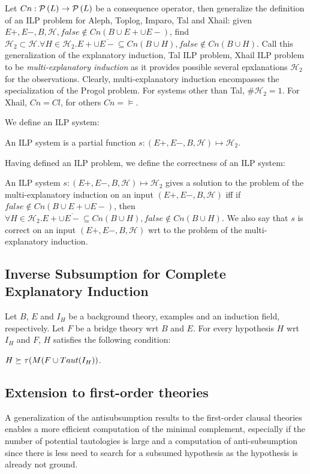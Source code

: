 Let $Cn:\mathcal{P} \left({ L }\right) \to \mathcal{P} \left({ L }\right)$ be a consequence operator, then generalize the definition of an ILP problem for Aleph, Toplog, Imparo, Tal and Xhail:
given $E+, E-, B, \mathcal{H}, false \not\in Cn(B \cup E+ \cup E-)$,
find $\mathcal{H}_2 \subset \mathcal{H}. \forall H \in \mathcal{H}_2. E+ \cup \overline{E-} \subseteq Cn(B \cup H), false \not\in Cn(B \cup H)$. Call this generalization of the explanatory induction, Tal ILP problem, Xhail ILP problem to be \emph{multi-explanatory induction} as it provides possible several epxlanations $\mathcal{H}_2$ for the observations. Clearly, multi-explanatory induction encompasses the specialization of the Progol problem. For systems other than Tal, $\#\mathcal{H}_2=1$. For Xhail, $Cn=Cl$, for others $Cn=\models$.

We define an ILP system:
\begin{defn}
An ILP system is a partial function $s:(E+,E-,B, \mathcal{H}) \mapsto \mathcal{H}_2$.
\end{defn}
Having defined an ILP problem, we define the correctness of an ILP system:
\begin{defn}
An ILP system $s:(E+,E-,B, \mathcal{H}) \mapsto \mathcal{H}_2$ gives a solution to the problem of the multi-explanatory induction on an input $(E+,E-,B, \mathcal{H})$ iff if $false \not\in Cn(B \cup E+ \cup E-)$,
then $\forall H \in \mathcal{H}_2. E+ \cup \overline{E-} \subseteq Cn(B \cup H), false \not\in Cn(B \cup H)$. We also say that $s$ is correct on an input $(E+,E-,B, \mathcal{H})$ wrt to the problem of the multi-explanatory induction.
\end{defn}

\subsection{Inverse Subsumption for Complete Explanatory Induction}
\begin{lemma}\label{yamamoto2012inverseLemma2}\cite{yamamoto2012inverse}
Let $B$, $E$ and $I_H$ be a background theory, examples and an induction field,
respectively. Let $F$ be a bridge theory wrt $B$ and $E$. For every hypothesis $H$ wrt $I_H$ and $F$, $H$ satisfies the following condition:

$H \succeq \tau(M(F \cup Taut(I_H))$.
\end{lemma}

\subsection{Extension to first-order theories}
A generalization of the antisubsumption results to the first-order clausal theories enables a more efficient computation of the minimal complement, especially if the number of potential tautologies is large and a computation of anti-subsumption since there is less need to search for a subsumed hypothesis as the hypothesis is already not ground.

